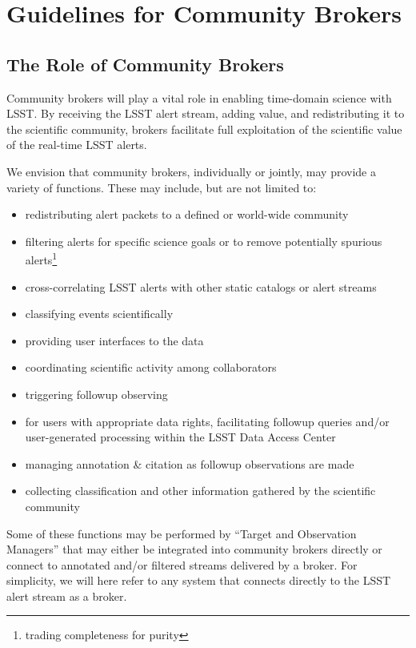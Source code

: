 \section{Guidelines for Community Brokers}\label{sec:community_brokers}

\subsection{The Role of Community Brokers}

Community brokers will play a vital role in enabling time-domain science with LSST.
By receiving the LSST alert stream, adding value, and redistributing it to the scientific community, brokers facilitate full exploitation of the scientific value of the real-time LSST alerts.

We envision that community brokers, individually or jointly, may provide a variety of functions.  These may include, but are not limited to:

\begin{itemize}
	\item redistributing alert packets to a defined or world-wide community
	\item filtering alerts for specific science goals or to remove potentially spurious alerts\footnote{trading completeness for purity}
	\item cross-correlating LSST alerts with other static catalogs or alert streams
	\item classifying events scientifically
	\item providing user interfaces to the data
	\item coordinating scientific activity among collaborators
	\item triggering followup observing
	\item for users with appropriate data rights, facilitating followup queries and/or user-generated processing within the LSST Data Access Center
	\item managing annotation \& citation as followup observations are made
	\item collecting classification and other information gathered by the scientific community
\end{itemize}

Some of these functions may be performed by ``Target and Observation Managers'' \citep[TOMs;][]{2018SPIE10707E..11S} that may either be integrated into community brokers directly or connect to annotated and/or filtered streams delivered by a broker.
For simplicity, we will here refer to any system that connects directly to the LSST alert stream as a broker.

